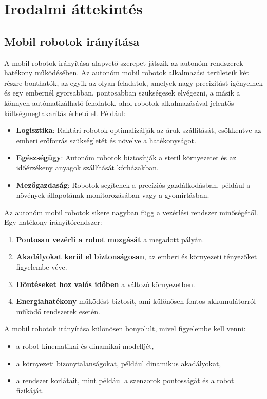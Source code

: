 \chapter{Irodalmi áttekintés}

\section{Mobil robotok irányítása}
A mobil robotok irányítása alapvető szerepet játszik az autonóm rendszerek hatékony működésében. Az autonóm mobil robotok  alkalmazási területeik két részre bonthatók, az egyik az olyan feladatok, amelyek nagy precizitást igényelnek és egy embernél gyorsabban, pontosabban szükségesek elvégezni, a másik a könnyen autómatizálható feladatok, ahol robotok alkalmazásával jelentős költségmegtakarítás érhető el. Például:

\begin{itemize}
    \item \textbf{Logisztika}: Raktári robotok optimalizálják az áruk szállítását, csökkentve az emberi erőforrás szükségletét és növelve a hatékonyságot.
    \item \textbf{Egészségügy}: Autonóm robotok biztosítják a steril környezetet és az időérzékeny anyagok szállítását kórházakban.
    \item \textbf{Mezőgazdaság}: Robotok segítenek a precíziós gazdálkodásban, például a növények állapotának monitorozásában vagy a gyomirtásban.
\end{itemize}

Az autonóm mobil robotok sikere nagyban függ a vezérlési rendszer minőségétől. Egy hatékony irányítórendszer:
\begin{enumerate}
    \item \textbf{Pontosan vezérli a robot mozgását} a megadott pályán.
    \item \textbf{Akadályokat kerül el biztonságosan}, az emberi és környezeti tényezőket figyelembe véve.
    \item \textbf{Döntéseket hoz valós időben} a változó környezetben.
    \item \textbf{Energiahatékony} működést biztosít, ami különösen fontos akkumulátorról működő rendszerek esetén.
\end{enumerate}

A mobil robotok irányítása különösen bonyolult, mivel figyelembe kell venni:
\begin{itemize}
    \item a robot kinematikai és dinamikai modelljét,
    \item a környezeti bizonytalanságokat, például dinamikus akadályokat,
    \item a rendszer korlátait, mint például a szenzorok pontosságát és a robot fizikáját.
\end{itemize}

